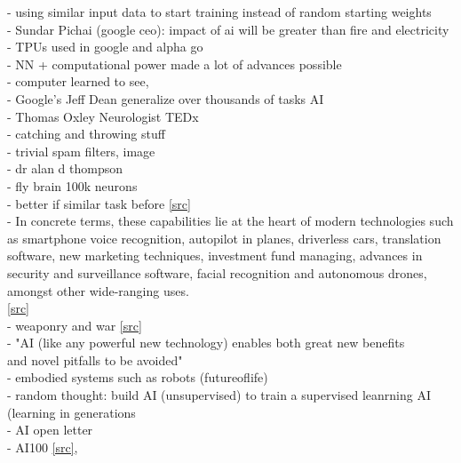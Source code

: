  - using similar input data to start training instead of random starting weights\\
 - Sundar Pichai (google ceo): impact of ai will be greater than fire and electricity\\
 - TPUs used in google and alpha go \\
 - NN + computational power made a lot of advances possible\\
 - computer learned to see, \\
 - Google's Jeff Dean generalize over thousands of tasks AI\\
 - Thomas Oxley Neurologist TEDx\\
 - catching and throwing stuff \\
 - trivial spam filters, image\\
 - dr alan d thompson\\
 - fly brain 100k neurons \cite{Zheng2018} \href{https://en.wikipedia.org/wiki/List\_of\_animals\_by\_number\_of\_neurons{[wiki]}}\\
 - better if similar task before \href{https://www.cs.ubc.ca/~amuham01/LING530/papers/radford2018improving.pdf}{[src]}\\
 - In concrete terms, these capabilities lie at the heart of modern technologies such as smartphone voice recognition, autopilot in planes, driverless cars, translation software, new marketing techniques, investment fund managing, advances in security and surveillance software, facial recognition and autonomous drones, amongst other wide-ranging uses.\\
 \href{https://onlinelibrary.wiley.com/doi/full/10.1111/1467-923X.12794}{[src]}\cite{Hassan2020}\\
 - weaponry and war \href{https://futureoflife.org/data/documents/research\_priorities.pdf}{[src]}\\
 - "AI (like any powerful new technology) enables both great new benefits\\
 and novel pitfalls to be avoided"\\
 - embodied systems such as robots (futureoflife)\\
 - random thought: build AI (unsupervised) to train a supervised leanrning AI (learning in generations\\
 - AI open letter \cite{Russel2015}\\
 - AI100 \href{https://ai100.stanford.edu/gathering-strength-gathering-storms-one-hundred-year-study-artificial-intelligence-ai100-2021-study}{[src]}, \\
